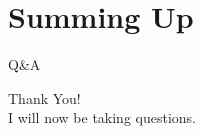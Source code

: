 \section{Summing Up}




\begin{frame}{Q\&A}
\begin{center}
{\Huge Thank You!}\\[10pt]
I will now be taking questions.
\end{center}
\end{frame}
